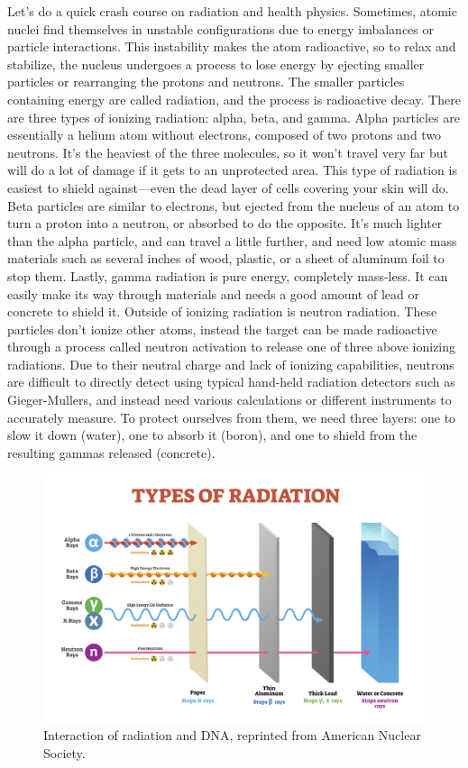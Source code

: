 \documentclass[12pt,twoside]{reedthesis}
\begin{document}
Let's do a quick crash course on radiation and health physics. Sometimes, atomic nuclei find themselves in unstable configurations due to energy imbalances or particle interactions. This instability makes the atom radioactive, so to relax and stabilize, the nucleus undergoes a process to lose energy by ejecting smaller particles or rearranging the protons and neutrons. The smaller particles containing energy are called radiation, and the process is radioactive decay. There are three types of ionizing radiation: alpha, beta, and gamma. Alpha particles are essentially a helium atom without electrons, composed of two protons and two neutrons. It's the heaviest of the three molecules, so it won't travel very far but will do a lot of damage if it gets to an unprotected area. This type of radiation is easiest to shield against---even the dead layer of cells covering your skin will do. Beta particles are similar to electrons, but ejected from the nucleus of an atom to turn a proton into a neutron, or absorbed to do the opposite. It's much lighter than the alpha particle, and can travel a little further, and need low atomic mass materials such as several inches of wood, plastic, or a sheet of aluminum foil to stop them. Lastly, gamma radiation is pure energy, completely mass-less. It can easily make its way through materials and needs a good amount of lead or concrete to shield it. Outside of ionizing radiation is neutron radiation. These particles don't ionize other atoms, instead the target can be made radioactive through a process called neutron activation to release one of three above ionizing radiations. Due to their neutral charge and lack of ionizing capabilities, neutrons are difficult to directly detect using typical hand-held radiation detectors such as Gieger-Mullers, and instead need various calculations or different instruments to accurately measure. To protect ourselves from them, we need three layers: one to slow it down (water), one to absorb it (boron), and one to shield from the resulting gammas released (concrete).
\begin{figure}

{\centering \includegraphics[width=1\linewidth]{figure/types of radiation} 

}

\caption{Interaction of radiation and DNA, reprinted from American Nuclear Society.}\label{fig:typesOfRadiation}
\end{figure}
\end{document}
